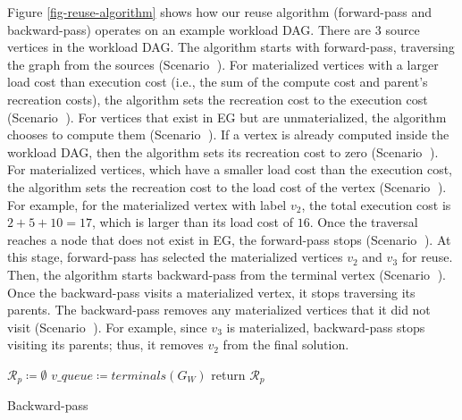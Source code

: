 Figure \ref{fig-reuse-algorithm} shows how our reuse algorithm (forward-pass and backward-pass) operates on an example workload DAG.
There are 3 source vertices in the workload DAG.
The algorithm starts with forward-pass, traversing the graph from the sources (Scenario \textcircled{}).
For materialized vertices with a larger load cost than execution cost (i.e., the sum of the compute cost and parent's recreation costs), the algorithm sets the recreation cost to the execution cost (Scenario \textcircled{}).
For vertices that exist in EG but are unmaterialized, the algorithm chooses to compute them (Scenario \textcircled{}).
If a vertex is already computed inside the workload DAG, then the algorithm sets its recreation cost to zero (Scenario \textcircled{}).
For materialized vertices, which have a smaller load cost than the execution cost, the algorithm sets the recreation cost to the load cost of the vertex (Scenario \textcircled{}).
For example, for the materialized vertex with label $v_2$, the total execution cost is $2 + 5 + 10 = 17$, which is larger than its load cost of $16$.
Once the traversal reaches a node that does not exist in EG, the forward-pass stops (Scenario \textcircled{}).
At this stage, forward-pass has selected the materialized vertices $v_2$ and $v_3$ for reuse.
Then, the algorithm starts backward-pass from the terminal vertex (Scenario \textcircled{}).
Once the backward-pass visits a materialized vertex, it stops traversing its parents.
The backward-pass removes any materialized vertices that it did not visit (Scenario \textcircled{}).
For example, since $v_3$ is materialized, backward-pass stops visiting its parents; thus, it removes $v_2$ from the final solution.
\begin{algorithm}[h]
$\mathcal{R}_p \coloneqq \emptyset$\;
$v\_queue \coloneqq terminals(G_W)$\;
return $\mathcal{R}_p$\;
\caption{Backward-pass}\label{backward-pass}
\end{algorithm}

